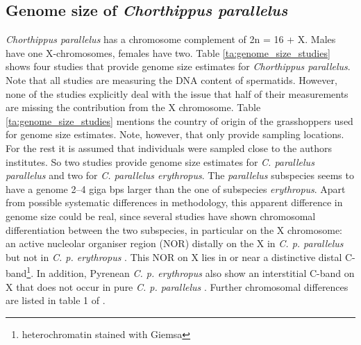 \documentclass[a4paper,12pt,times,print,index,custombib,custommargin]{PhDThesisPSnPDF}\usepackage[]{graphicx}\usepackage[]{color}
\begin{document}
\FloatBarrier
\subsection{Genome size of \textit{Chorthippus parallelus}}\label{ch:Genome_size}

\textit{Chorthippus parallelus} has a chromosome complement of 2n = 16 + X. Males have one X-chromosomes, females have two. Table \ref{ta:genome_size_studies} shows four studies that provide genome size estimates for \textit{Chorthippus parallelus}. Note that all studies are measuring the DNA content of spermatids. However, none of the studies explicitly deal with the issue that half of their measurements are missing the contribution from the X chromosome. Table \ref{ta:genome_size_studies} mentions the country of origin of the grasshoppers used for genome size estimates. Note, however, that only \cite{Belda1991} provide sampling locations. For the rest it is assumed that individuals were sampled close to the authors institutes. So two studies provide genome size estimates for \textit{C. parallelus parallelus} and two for \textit{C. parallelus erythropus}. The \textit{parallelus} subspecies seems to have a genome 2--4 giga \glspl{bp} larger than the one of subspecies \textit{erythropus}. Apart from possible systematic differences in methodology, this apparent difference in genome size could be real, since several studies have shown chromosomal differentiation between the two subspecies, in particular on the X chromosome: an active nucleolar organiser region (NOR) distally on the X in \textit{C. p. parallelus} but not in \textit{C. p. erythropus} \citep{Gosalvez1988}. This NOR on X lies in or near a distinctive distal C-band\footnote{\gls{heterochromatin} stained with Giemsa}. In addition, Pyrenean \textit{C. p. erythropus} also show an interstitial C-band on X that does not occur in pure \textit{C. p. parallelus} \citep{Bella2007}. Further chromosomal differences are listed in table 1 of \cite{Ferris1993}.
\end{document}
